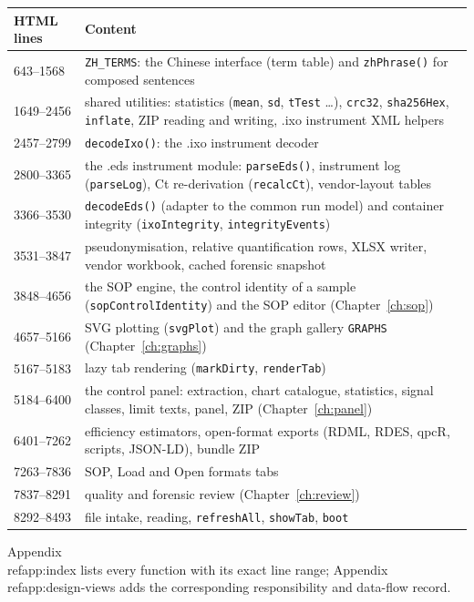 \begin{center}\small
\begin{tabular}{@{}lp{10.8cm}@{}}\toprule
HTML lines & Content\\\midrule
643--1568 & \texttt{ZH\_TERMS}: the Chinese interface (term table) and \texttt{zhPhrase()} for composed sentences\\
1649--2456 & shared utilities: statistics (\texttt{mean}, \texttt{sd}, \texttt{tTest} \dots), \texttt{crc32}, \texttt{sha256Hex}, \texttt{inflate}, ZIP reading and writing, .ixo instrument XML helpers\\
2457--2799 & \texttt{decodeIxo()}: the .ixo instrument decoder\\
2800--3365 & the .eds instrument module: \texttt{parseEds()}, instrument log (\texttt{parseLog}), Ct re-derivation (\texttt{recalcCt}), vendor-layout tables\\
3366--3530 & \texttt{decodeEds()} (adapter to the common run model) and container integrity (\texttt{ixoIntegrity}, \texttt{integrityEvents})\\
3531--3847 & pseudonymisation, relative quantification rows, XLSX writer, vendor workbook, cached forensic snapshot\\
3848--4656 & the SOP engine, the control identity of a sample (\texttt{sopControlIdentity}) and the SOP editor (Chapter~\ref{ch:sop})\\
4657--5166 & SVG plotting (\texttt{svgPlot}) and the graph gallery \texttt{GRAPHS} (Chapter~\ref{ch:graphs})\\
5167--5183 & lazy tab rendering (\texttt{markDirty}, \texttt{renderTab})\\
5184--6400 & the control panel: extraction, chart catalogue, statistics, signal classes, limit texts, panel, ZIP (Chapter~\ref{ch:panel})\\
6401--7262 & efficiency estimators, open-format exports (RDML, RDES, qpcR, scripts, JSON-LD), bundle ZIP\\
7263--7836 & SOP, Load and Open formats tabs\\
7837--8291 & quality and forensic review (Chapter~\ref{ch:review})\\
8292--8493 & file intake, reading, \texttt{refreshAll}, \texttt{showTab}, \texttt{boot}\\\bottomrule
\end{tabular}
\end{center}

Appendix~\\ref{app:index} lists every function with its exact line range; Appendix~\\ref{app:design-views} adds the corresponding responsibility and data-flow record.

